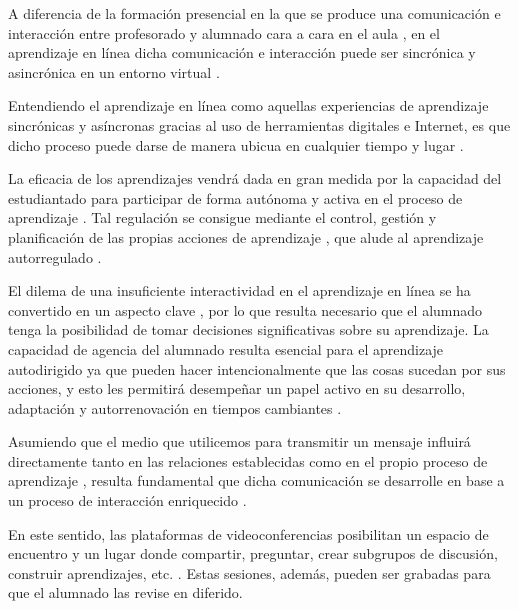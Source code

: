 \documentclass[spanish]{textolivre}
\begin{document}
A diferencia de la formación presencial en la que se produce una comunicación e interacción entre profesorado y alumnado cara a cara en el aula \cite{artino_exploring_2012}, en el aprendizaje en línea dicha comunicación e interacción puede ser sincrónica y asincrónica en un entorno virtual \cite{ku_effect_2011}.

Entendiendo el aprendizaje en línea como aquellas experiencias de aprendizaje sincrónicas y asíncronas gracias al uso de herramientas digitales e Internet, es que dicho proceso puede darse de manera ubicua en cualquier tiempo y lugar \cite{gros_salvat_evolucion_2018,singh_how_2019}.

La eficacia de los aprendizajes vendrá dada en gran medida por la capacidad del estudiantado para participar de forma autónoma y activa en el proceso de aprendizaje \cite{wang_students_2013,lai_self-regulated_2016,van_alten_self-regulated_2020}. Tal regulación se consigue mediante el control, gestión y planificación de las propias acciones de aprendizaje \cite{ally2004}, que alude al aprendizaje autorregulado \cite{zimmerman_investigating_2008,panadero_review_2017,marcelo_aprendizaje_2019}.

El dilema de una insuficiente interactividad en el aprendizaje en línea se ha convertido en un aspecto clave \cite{liu_contexts_2017}, por lo que resulta necesario que el alumnado tenga la posibilidad de tomar decisiones significativas sobre su aprendizaje. La capacidad de agencia del alumnado resulta esencial para el aprendizaje autodirigido ya que pueden hacer intencionalmente que las cosas sucedan por sus acciones, y esto les permitirá desempeñar un papel activo en su desarrollo, adaptación y autorrenovación en tiempos cambiantes \cite{bandura_social_2001}.

Asumiendo que el medio que utilicemos para transmitir un mensaje influirá directamente tanto en las relaciones establecidas como en el propio proceso de aprendizaje \cite{aviles_comunicar_nodate}, resulta fundamental que dicha comunicación se desarrolle en base a un proceso de interacción enriquecido \cite{fernandez_perez_pedagogidigital_2020}.

En este sentido, las plataformas de videoconferencias posibilitan un espacio de encuentro y un lugar donde compartir, preguntar, crear subgrupos de discusión, construir aprendizajes, etc. \cite{mottet_interactive_2000,falloon_exploring_2011,rainbow_ideas_2020}. Estas sesiones, además, pueden ser grabadas para que el alumnado las revise en diferido.
\end{document}
